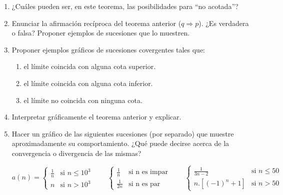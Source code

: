 \documentclass[12pt]{article}
\newtheorem*{myteo}{Teorema} %
\theoremstyle{definition}
\begin{document}
\begin{enumerate}
\item ¿Cuáles pueden ser, en este teorema, las posibilidades para “no acotada”?


\item Enunciar la afirmación recíproca del teorema anterior  ($q\Rightarrow p$). ¿Es verdadera o falsa? Proponer ejemplos de sucesiones que lo muestren.


\item Proponer ejemplos gráficos de sucesiones covergentes tales que:
\begin{enumerate}
\setlength\itemsep{0em}
\item el límite coincida con alguna cota superior.
\item el límite coincida con alguna cota inferior.
\item el límite no coincida con ninguna cota.
\end{enumerate}
	
\vspace{0.5 cm}

\item Interpretar gráficamente el teorema anterior y explicar.

\item Hacer un gráfico de las siguientes sucesiones (por separado) que muestre aproximadamente su comportamiento. ¿Qué puede decirse acerca de la convergencia o divergencia de las mismas?
\setlength\itemsep{0em}

\begin{equation*} 
a(n)= 
\begin{cases} 
 \frac{1}{n} & \text{si }  n \leq 10^3 \\
n & \text{si }  n >10^3
\end{cases} \qquad
\begin{cases} 
 \frac{1}{n}  & \text{si  n es impar} \\
 \frac{1}{2n}  & \text{si  n es par}
\end{cases} \qquad
\begin{cases} 
 \frac{1}{3n-2} & \text{si }  n \leq 50 \\
 n.[(-1)^n +1] & \text{si } n > 50
\end{cases}
\end{equation*}
	

\end{enumerate}
\end{document}
